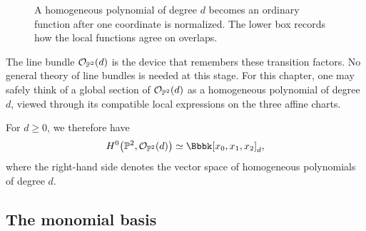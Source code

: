 \begin{figure}[ht]
\centering
{}
\caption{A homogeneous polynomial of degree \(d\) becomes an ordinary
function after one coordinate is normalized. The lower box records
how the local functions agree on overlaps.}
\label{fig:p2-local-sections}
\end{figure}

\begin{observation}
The line bundle \(\mathcal{O}_{\mathbb{P}^2}(d)\) is the device that remembers these
transition factors. No general theory of line bundles is needed at
this stage. For this chapter, one may safely think of a global section
of \(\mathcal{O}_{\mathbb{P}^2}(d)\) as a homogeneous polynomial of degree \(d\),
viewed through its compatible local expressions on the three affine
charts.
\end{observation}

For \(d\geq0\), we therefore have
\[
\Hzero{\PP^2}{\cO_{\PP^2}(d)}
\simeq
\Bbbk[x_0,x_1,x_2]_d,
\]
where the right-hand side denotes the vector space of homogeneous
polynomials of degree \(d\).

\subsection{The monomial basis}

